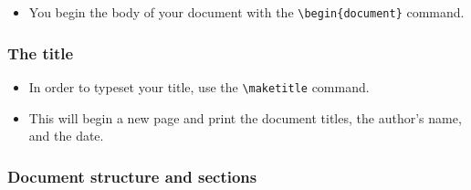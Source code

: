 \documentclass[11pt, letterpaper]{article}
\begin{document}
    \begin{itemize}
      \item You begin the body of your document with the \verb+\begin{document}+ command.
    \end{itemize}

  
  \subsubsection{The title}
  
    \begin{itemize}
      \item In order to typeset your title, use the \verb+\maketitle+ command.
      
      \item This will begin a new page and print the document titles, the author's name, and the date.
    \end{itemize}
  
  \subsubsection{Document structure and sections}\label{S:Structure}
  
\end{document}
